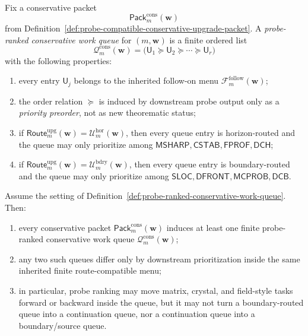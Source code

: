 \begin{definition}
\label{def:probe-ranked-conservative-work-queue}
Fix a conservative packet
\[
 \mathsf{Pack}^{\mathrm{cons}}_{m}(\mathbf w)
\]
from Definition~\ref{def:probe-compatible-conservative-upgrade-packet}. A \emph{probe-ranked conservative work queue} for \((m,\mathbf w)\) is a finite ordered list
\[
 \mathcal Q^{\mathrm{cons}}_{m}(\mathbf w)
 =
 \bigl(\mathsf U_1\succcurlyeq \mathsf U_2\succcurlyeq \cdots \succcurlyeq \mathsf U_r\bigr)
\]
with the following properties:
\begin{enumerate}[label=(\roman*)]
 \item every entry \(\mathsf U_j\) belongs to the inherited follow-on menu \(\mathcal F^{\mathrm{follow}}_{m}(\mathbf w)\);
 \item the order relation \(\succcurlyeq\) is induced by downstream probe output only as a \emph{priority preorder}, not as new theorematic status;
 \item if \(\mathsf{Route}^{\mathrm{upg}}_{m}(\mathbf w)=\mathcal U^{\mathrm{hor}}_{m}(\mathbf w)\), then every queue entry is horizon-routed and the queue may only prioritize among \(\mathsf{MSHARP},\mathsf{CSTAB},\mathsf{FPROF},\mathsf{DCH}\);
 \item if \(\mathsf{Route}^{\mathrm{upg}}_{m}(\mathbf w)=\mathcal U^{\mathrm{bdry}}_{m}(\mathbf w)\), then every queue entry is boundary-routed and the queue may only prioritize among \(\mathsf{SLOC},\mathsf{DFRONT},\mathsf{MCPROB},\mathsf{DCB}\).
\end{enumerate}
\end{definition}

\begin{proposition}
\label{prop:every-conservative-packet-induces-a-finite-route-compatible-work-queue}
Assume the setting of Definition~\ref{def:probe-ranked-conservative-work-queue}. Then:
\begin{enumerate}[label=(\roman*)]
 \item every conservative packet \(\mathsf{Pack}^{\mathrm{cons}}_{m}(\mathbf w)\) induces at least one finite probe-ranked conservative work queue \(\mathcal Q^{\mathrm{cons}}_{m}(\mathbf w)\);
 \item any two such queues differ only by downstream prioritization inside the same inherited finite route-compatible menu;
 \item in particular, probe ranking may move matrix, crystal, and field-style tasks forward or backward inside the queue, but it may not turn a boundary-routed queue into a continuation queue, nor a continuation queue into a boundary/source queue.
\end{enumerate}
\end{proposition}

